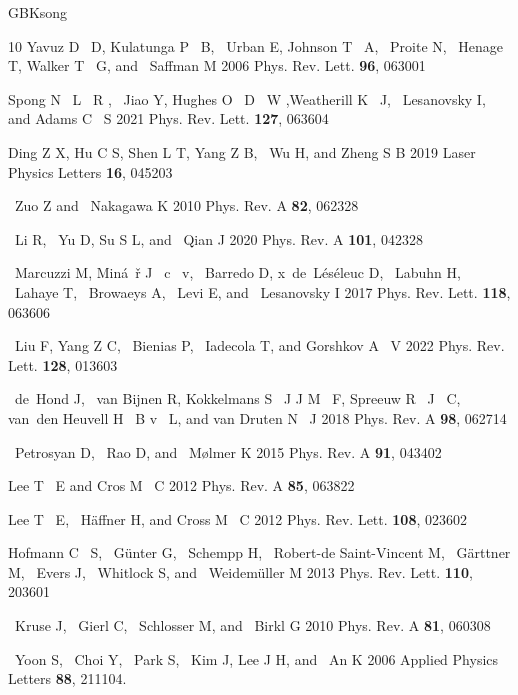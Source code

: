 \documentclass{cpbtex}
\begin{document}
\begin{CJK*}{GBK}{song}
\begin{thebibliography}{10}
Yavuz D ~D, Kulatunga P ~B, ~Urban E, Johnson T ~A, ~Proite N, ~Henage T,
 Walker T ~G, and ~Saffman M 2006 {{Phys.
  Rev. Lett.}} \textbf{96}, 063001

Spong N ~L ~R , ~Jiao Y, Hughes O ~D ~W ,Weatherill  K ~J, ~Lesanovsky I, and
 Adams  C ~S 2021 {{Phys. Rev. Lett.}} \textbf{127}, 063604

Ding Z X, Hu C S, Shen L T, Yang Z B, ~Wu H, and Zheng S B 2019 {{Laser Physics Letters}} \textbf{16}, 045203

~Zuo Z and ~Nakagawa K 2010 {{Phys. Rev. A}} \textbf{82}, 062328

~Li R, ~Yu D, Su S L, and ~Qian J 2020 {{Phys. Rev. A}} \textbf{101}, 042328

~Marcuzzi M, Min\'a\ifmmode~\else \v{r}\fi{} J ~c ~v, ~Barredo D,
  x~de~L\'es\'eleuc D, ~Labuhn H, ~Lahaye T, ~Browaeys A, ~Levi E, and
  ~Lesanovsky I 2017 {{Phys. Rev. Lett.}} \textbf{118}, 063606

~Liu F, Yang Z C, ~Bienias P, ~Iadecola T, and Gorshkov A ~V 2022 {{Phys. Rev. Lett.}} \textbf{128}, 013603 

~de~Hond J, ~van Bijnen R, Kokkelmans S ~J J M ~F, Spreeuw R ~J ~C, van~den Heuvell H ~B 
  v ~L, and van Druten N ~J 2018 {{Phys. Rev. A}} \textbf{98}, 062714

~Petrosyan D, ~Rao D, and ~M\o{}lmer K 2015 {{Phys. Rev. A}} \textbf{91}, 043402

Lee T ~E and Cros M ~C 2012 {{Phys. Rev. A}} \textbf{85},
  063822 

Lee T ~E, ~H\"affner H, and Cross M ~C 2012 {{Phys. Rev. Lett.}} \textbf{108},
  023602

Hofmann C ~S, ~G\"unter G, ~Schempp H, ~Robert-de Saint-Vincent M,
  ~G\"arttner M, ~Evers J, ~Whitlock S, and ~Weidem\"uller M 2013 {{Phys. Rev. Lett.}} \textbf{110}, 203601

~Kruse J, ~Gierl C, ~Schlosser M, and ~Birkl G 2010 {{Phys. Rev. A}} \textbf{81},
  060308

~Yoon S, ~Choi Y, ~Park S, ~Kim J, Lee J H, and ~An K 2006 {{Applied Physics Letters}}
  \textbf{88}, 211104.


\end{thebibliography}
\end{CJK*}
\end{document}
